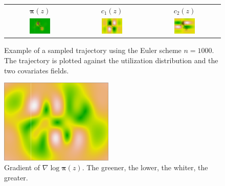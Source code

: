 \documentclass[10pt,a4paper, draft]{article}
\newcommand{\ud}{\boldsymbol{\pi}}
\begin{document}
\begin{figure}
\centering
\begin{tabular}{ccc}
$\ud(z)$&$c_1(z)$&$c_2(z)$\\
\includegraphics[width = 0.32\textwidth]{figures/TrajPlusUD}&
\includegraphics[width = 0.32\textwidth]{figures/TrajPlusC1}&
\includegraphics[width = 0.32\textwidth]{figures/TrajPlusC2}
\end{tabular}
\caption{\label{fig:ExampleTrajectory} Example of a sampled trajectory using the Euler scheme $n = 1000$. The trajectory is plotted against the utilization distribution and the two covariates fields.}
\end{figure}
\begin{figure}
\centering
\includegraphics[width = 0.48\textwidth]{figures/GradientNorm}
\caption{\label{fig:GradientNorm} Gradient of $\nabla \log \ud(z)$. The greener, the lower, the whiter, the greater.}
\end{figure}
\end{document}
